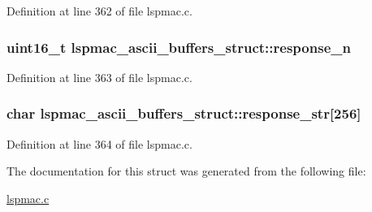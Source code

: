 Definition at line 362 of file lspmac.\-c.

\hypertarget{structlspmac__ascii__buffers__struct_a97c2fdd21eec29c2cba993e361c3c069}{
\subsubsection[{response\-\_\-n}]{\setlength{\rightskip}{0pt plus 5cm}uint16\-\_\-t lspmac\-\_\-ascii\-\_\-buffers\-\_\-struct\-::response\-\_\-n}}\label{structlspmac__ascii__buffers__struct_a97c2fdd21eec29c2cba993e361c3c069}


Definition at line 363 of file lspmac.\-c.

\hypertarget{structlspmac__ascii__buffers__struct_a32c4baecf20143eb71d348b6b5679039}{
\subsubsection[{response\-\_\-str}]{\setlength{\rightskip}{0pt plus 5cm}char lspmac\-\_\-ascii\-\_\-buffers\-\_\-struct\-::response\-\_\-str\mbox{[}256\mbox{]}}}\label{structlspmac__ascii__buffers__struct_a32c4baecf20143eb71d348b6b5679039}


Definition at line 364 of file lspmac.\-c.



The documentation for this struct was generated from the following file\-:\begin{DoxyCompactItemize}
\item 
\hyperlink{lspmac_8c}{lspmac.\-c}\end{DoxyCompactItemize}
